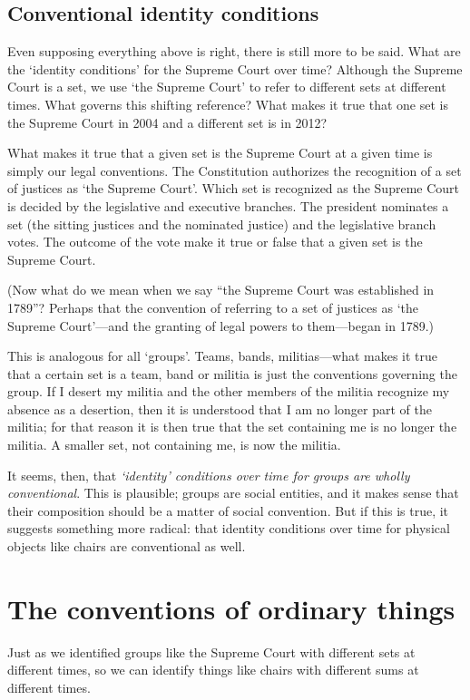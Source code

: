 \documentclass[11pt]{article}
\begin{document}
\begin{spacing}{1.5}
\subsection{Conventional identity conditions}
\label{set-convention}
Even supposing everything above is right, there is still more to be
said.  What are the `identity conditions' for the Supreme Court over
time?  Although the Supreme Court is a set, we use `the Supreme Court'
to refer to different sets at different times.  What governs this
shifting reference?  What makes it true that one set is the Supreme
Court in 2004 and a different set is in 2012?

What makes it true that a given set is the Supreme Court at a given
time is simply our legal conventions.  The Constitution authorizes the
recognition of a set of justices as `the Supreme Court'.  Which set is
recognized as the Supreme Court is decided by the legislative and
executive branches.  The president nominates a set (the sitting
justices and the nominated justice) and the legislative branch votes.
The outcome of the vote make it true or false that a given set is the
Supreme Court.

(Now what do we mean when we say ``the Supreme Court was established
in 1789''?  Perhaps that the convention of referring to a set of
justices as `the Supreme Court'---and the granting of legal powers to
them---began in 1789.)

This is analogous for all `groups'.  Teams, bands, militias---what
makes it true that a certain set is a team, band or militia is just
the conventions governing the group.  If I desert my militia and the
other members of the militia recognize my absence as a desertion, then
it is understood that I am no longer part of the militia; for that
reason it is then true that the set containing me is no longer the
militia.  A smaller set, not containing me, is now the militia.

It seems, then, that {\em `identity' conditions over time for groups
  are wholly conventional}.  This is plausible; groups are social
entities, and it makes sense that their composition should be a matter
of social convention.  But if this is true, it suggests something more
radical: that identity conditions over time for physical objects like
chairs are conventional as well.

\section{The conventions of ordinary things}
\label{chair-ref}
Just as we identified groups like the Supreme Court with different
sets at different times, so we can identify things like chairs with
different sums at different times.


\end{spacing}
\end{document}
